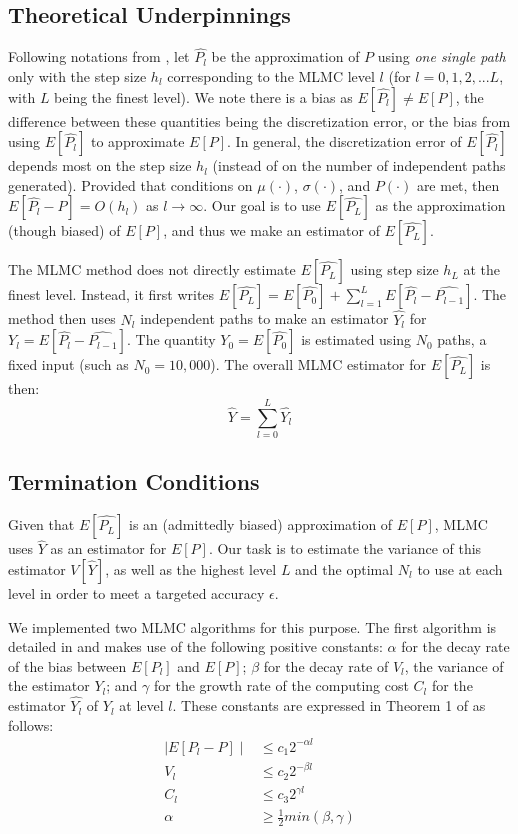 \documentclass{article}
\begin{document}
\subsection{Theoretical Underpinnings}
	Following notations from \cite{giles08}, let $\widehat{P_l}$ be the approximation of $P$ using \textit{one single path} only with the step size $h_l$ corresponding to the MLMC level $l$ (for $l=0,1,2,...L$, with $L$ being the finest level). We note there is a bias as $E[\widehat{P_l}] \neq E[P]$, the difference between these quantities being the discretization error, or the bias from using $E[\widehat{P_l}]$ to approximate $E[P]$. In general, the discretization error of $E[\widehat{P_l}]$ depends most on the step size $h_l$ (instead of on the number of independent paths generated). Provided that  conditions on $\mu(\cdot)$, $\sigma(\cdot)$, and $P(\cdot)$ are met, then $E[\widehat{P_l} - P] = O(h_l)$ as $l\rightarrow \infty$. Our goal is to use $E[\widehat{P_L}]$ as the approximation (though biased) of $E[P]$, and thus we make an estimator of $E[\widehat{P_L}]$.
		
    The MLMC method does not directly estimate $E[\widehat{P_L}]$ using step size $h_L$ at the finest level. Instead, it first writes $E[\widehat{P_L}] = E[\widehat{P_0}] + \sum_{l=1}^L E[\widehat{P_l} - \widehat{P_{l-1}}]$. The method then uses $N_l$ independent paths to make an estimator $\widehat{Y_l}$ for $Y_l = E[\widehat{P_l} - \widehat{P_{l-1}}]$. The quantity $Y_0 = E[\widehat{P_0}]$ is estimated using $N_0$ paths, a fixed input (such as $N_0=10,000$). The overall MLMC estimator for $E[\widehat{P_L}]$ is then:
	$$\widehat{Y} = \sum_{l=0}^L \widehat{Y_l}$$
	
\subsection{Termination Conditions}
	Given that $E[\widehat{P_L}]$ is an (admittedly biased) approximation of $E[P]$, MLMC uses $\widehat{Y}$ as an estimator for $E[P]$. Our task is to estimate the variance of this estimator $V[\widehat{Y}]$, as well as the highest level $L$ and the optimal $N_l$ to use at each level in order to meet a targeted accuracy $\epsilon$.
	
	We implemented two MLMC algorithms for this purpose. The first algorithm is detailed in \cite{giles15} and makes use of the following positive constants: $\alpha$ for the decay rate of the bias between $E[P_l]$ and $E[P]$; $\beta$ for the decay rate of $V_l$, the variance of the estimator $Y_l$; and $\gamma$ for the growth rate of the computing cost $C_l$ for the estimator $\widehat{Y_l}$ of $Y_l$ at level $l$. These constants are expressed in Theorem 1 of \cite{giles15} as follows:
	\begin{align*}
	\mid E[P_l -P] \mid &\leq c_1 2^{-\alpha l} \\
	V_l &\leq c_2 2^{-\beta l} \\
	C_l &\leq c_3 2^{\gamma l} \\
    \alpha &\geq \frac{1}{2} min(\beta, \gamma)
	\end{align*}
	
\end{document}
